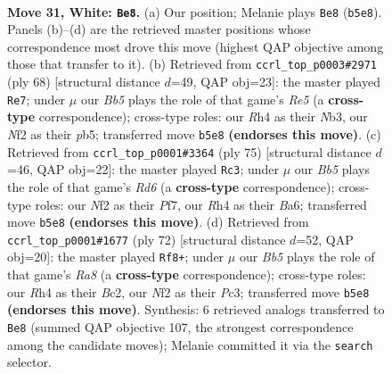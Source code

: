 \documentclass[11pt]{article}
\begin{document}
\clearpage

\begin{figure}[p]\centering
\begin{subfigure}{0.46\textwidth}\centering
\resizebox{\linewidth}{!}{%
\newchessgame
\chessboard[
  setfen={rn6/1b4k1/1n6/1B1p4/p6R/P5P1/1PP2N2/2K5 w - - 5 31},
  showmover=false,
  pgfstyle=straightmove, color=movearrow, markmove={b5-e8}
]}
\caption{}
\end{subfigure}\hfill
\begin{subfigure}{0.46\textwidth}\centering
\resizebox{\linewidth}{!}{%
\newchessgame
\chessboard[
  setfen={1kb5/8/p2n1r2/1p1pR3/1P6/PN6/2P3B1/1K6 w - - 1 35},
  showmover=false,
  pgfstyle=straightmove, color=movearrow, markmove={e5-e7}
]}
\caption{}
\end{subfigure}
\\[4pt]
\begin{subfigure}{0.46\textwidth}\centering
\resizebox{\linewidth}{!}{%
\newchessgame
\chessboard[
  setfen={5k2/5pp1/b1n1p2p/P7/6P1/1N1r4/5PP1/R2B2K1 b - - 8 38},
  showmover=false,
  pgfstyle=straightmove, color=movearrow, markmove={d3-c3}
]}
\caption{}
\end{subfigure}\hfill
\begin{subfigure}{0.46\textwidth}\centering
\resizebox{\linewidth}{!}{%
\newchessgame
\chessboard[
  setfen={R7/pr1p1k2/6pB/2nb1p1p/8/P1P3P1/2B2P1P/4K3 w - - 0 37},
  showmover=false,
  pgfstyle=straightmove, color=movearrow, markmove={a8-f8}
]}
\caption{}
\end{subfigure}
\caption{\textbf{Move 31, White: \texttt{Be8}.} (a) Our position; Melanie plays \texttt{Be8} (\texttt{b5e8}). Panels (b)--(d) are the retrieved master positions whose correspondence most drove this move (highest QAP objective among those that transfer to it). (b) Retrieved from \texttt{ccrl\_top\_p0003\#2971} (ply 68) [structural distance $d$=49, QAP obj=23]: the master played \texttt{Re7}; under $\mu$ our \emph{Bb5} plays the role of that game's \emph{Re5} (a \textbf{cross-type} correspondence); cross-type roles: our \emph{R}h4 as their \emph{N}b3, our \emph{N}f2 as their \emph{p}b5; transferred move \texttt{b5e8} \textbf{(endorses this move)}. (c) Retrieved from \texttt{ccrl\_top\_p0001\#3364} (ply 75) [structural distance $d$=46, QAP obj=22]: the master played \texttt{Rc3}; under $\mu$ our \emph{Bb5} plays the role of that game's \emph{Rd6} (a \textbf{cross-type} correspondence); cross-type roles: our \emph{N}f2 as their \emph{P}f7, our \emph{R}h4 as their \emph{B}a6; transferred move \texttt{b5e8} \textbf{(endorses this move)}. (d) Retrieved from \texttt{ccrl\_top\_p0001\#1677} (ply 72) [structural distance $d$=52, QAP obj=20]: the master played \texttt{Rf8+}; under $\mu$ our \emph{Bb5} plays the role of that game's \emph{Ra8} (a \textbf{cross-type} correspondence); cross-type roles: our \emph{R}h4 as their \emph{B}c2, our \emph{N}f2 as their \emph{P}c3; transferred move \texttt{b5e8} \textbf{(endorses this move)}. Synthesis: 6 retrieved analogs transferred to \texttt{Be8} (summed QAP objective 107, the strongest correspondence among the candidate moves); Melanie committed it via the \texttt{search} selector.}
\label{fig:thought-m60}
\end{figure}
\end{document}
